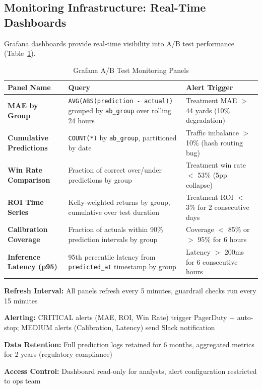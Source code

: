 \subsection{Monitoring Infrastructure: Real-Time Dashboards}

Grafana dashboards provide real-time visibility into A/B test performance (Table~\ref{tab:ab-grafana-panels}).

\begin{table}[htbp]
\centering
\small
\caption{Grafana A/B Test Monitoring Panels}
\label{tab:ab-grafana-panels}
\begin{tabular}{@{}p{3.5cm}p{5.5cm}p{4.0cm}@{}}
\toprule
\textbf{Panel Name} & \textbf{Query} & \textbf{Alert Trigger} \\
\midrule
\textbf{MAE by Group} & \texttt{AVG(ABS(prediction - actual))} grouped by \texttt{ab\_group} over rolling 24 hours & Treatment MAE $>$ 44 yards (10\% degradation) \\
\addlinespace[2pt]
\textbf{Cumulative Predictions} & \texttt{COUNT(*)} by \texttt{ab\_group}, partitioned by date & Traffic imbalance $>$ 10\% (hash routing bug) \\
\addlinespace[2pt]
\textbf{Win Rate Comparison} & Fraction of correct over/under predictions by group & Treatment win rate $<$ 53\% (5pp collapse) \\
\addlinespace[2pt]
\textbf{ROI Time Series} & Kelly-weighted returns by group, cumulative over test duration & Treatment ROI $<$ 3\% for 2 consecutive days \\
\addlinespace[2pt]
\textbf{Calibration Coverage} & Fraction of actuals within 90\% prediction intervals by group & Coverage $<$ 85\% or $>$ 95\% for 6 hours \\
\addlinespace[2pt]
\textbf{Inference Latency (p95)} & 95th percentile latency from \texttt{predicted\_at} timestamp by group & Latency $>$ 200ms for 6 consecutive hours \\
\bottomrule
\end{tabular}
\begin{tablenotes}
\item \textbf{Refresh Interval:} All panels refresh every 5 minutes, guardrail checks run every 15 minutes
\item \textbf{Alerting:} CRITICAL alerts (MAE, ROI, Win Rate) trigger PagerDuty + auto-stop; MEDIUM alerts (Calibration, Latency) send Slack notification
\item \textbf{Data Retention:} Full prediction logs retained for 6 months, aggregated metrics for 2 years (regulatory compliance)
\item \textbf{Access Control:} Dashboard read-only for analysts, alert configuration restricted to ops team
\end{tablenotes}
\end{table}

